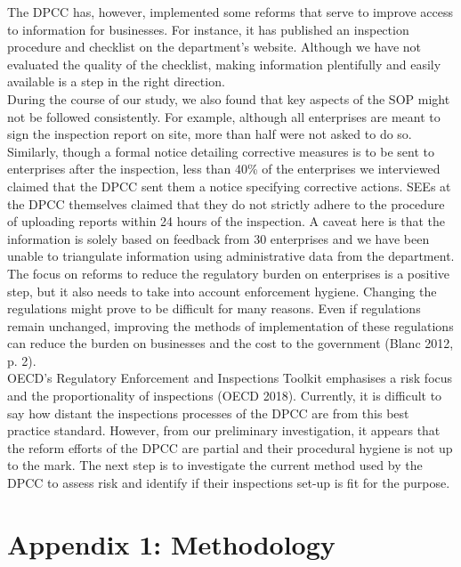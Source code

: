 \documentclass[a4paper, 12pt]{article}
\begin{document}
	The DPCC has, however, implemented some reforms that serve to improve access to information for businesses. For instance, it has published an inspection procedure and checklist on the department’s website. Although we have not evaluated the quality of the checklist, making information plentifully and easily available is a step in the right direction. \\
	
	During the course of our study, we also found that key aspects of the SOP might not be followed consistently. For example, although all enterprises are meant to sign the inspection report on site, more than half were not asked to do so. Similarly, though a formal notice detailing corrective measures is to be sent to enterprises after the inspection, less than 40\% of the enterprises we interviewed claimed that the DPCC sent them a notice specifying corrective actions. SEEs at the DPCC themselves claimed that they do not strictly adhere to the procedure of uploading reports within 24 hours of the inspection. A caveat here is that the information is solely based on feedback from 30 enterprises and we have been unable to triangulate information using administrative data from the department. \\
	
	The focus on reforms to reduce the regulatory burden on enterprises is a positive step, but it also needs to take into account enforcement hygiene. Changing the regulations might prove to be difficult for many reasons. Even if regulations remain unchanged, improving the methods of implementation of these regulations can reduce the burden on businesses and the cost to the government (Blanc 2012, p. 2). \\
	
	OECD’s Regulatory Enforcement and Inspections Toolkit emphasises a risk focus and the proportionality of inspections (OECD 2018). Currently, it is difficult to say how distant the inspections processes of the DPCC are from this best practice standard. However, from our preliminary investigation, it appears that the reform efforts of the DPCC are partial and their procedural hygiene is not up to the mark. The next step is to investigate the current method used by the DPCC to assess risk and identify if their inspections set-up is fit for the purpose. \\
	
	\newpage
		\section{Appendix 1: Methodology}
		
\end{document}
